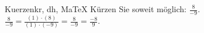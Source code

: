 \begin{MAufgabe}{Kuerzen}{kr, dh, MaTeX}
K\"urzen Sie soweit m\"oglich: $\frac{8}{-9}$.\\ 
\ifLsg\MLoesung
\quad $\frac{8}{-9}=\frac{(1)\cdot(8)}{(1)\cdot(-9)}=\frac{8}{-9}=\frac{-8}{9}$.\else\relax\fi
 \end{MAufgabe}
